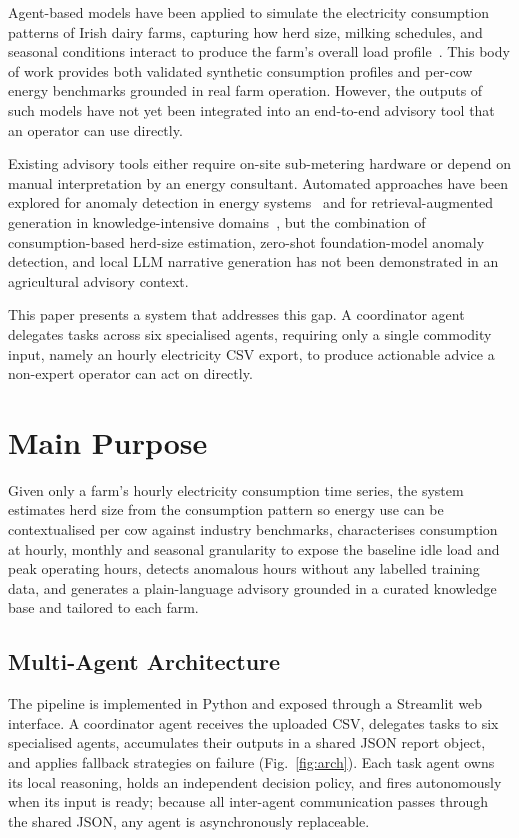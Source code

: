 \documentclass[runningheads]{llncs}
\begin{document}
Agent-based models have been applied to simulate the electricity consumption
patterns of Irish dairy farms, capturing how herd size, milking schedules, and
seasonal conditions interact to produce the farm's overall load
profile~\cite{Khaleghy2026}. This body of work provides both validated
synthetic consumption profiles and per-cow energy benchmarks grounded in real
farm operation. However, the outputs of such models have not yet been
integrated into an end-to-end advisory tool that an operator can use directly.

Existing advisory tools either require on-site sub-metering hardware or depend
on manual interpretation by an energy consultant. Automated approaches have
been explored for anomaly detection in energy systems~\cite{Cook2019} and for
retrieval-augmented generation in knowledge-intensive domains~\cite{Lewis2020},
but the combination of consumption-based herd-size estimation, zero-shot
foundation-model anomaly detection, and local LLM narrative generation has not
been demonstrated in an agricultural advisory context.

This paper presents a system that addresses this gap. A coordinator agent
delegates tasks across six specialised agents, requiring only a single
commodity input, namely an hourly electricity CSV export, to produce actionable
advice a non-expert operator can act on directly.

\section{Main Purpose}
\label{sec:purpose}

Given only a farm's hourly electricity consumption time series, the system
estimates herd size from the consumption pattern so energy use can be
contextualised per cow against industry benchmarks, characterises consumption
at hourly, monthly and seasonal granularity to expose the baseline idle load
and peak operating hours, detects anomalous hours without any labelled
training data, and generates a plain-language advisory grounded in a curated
knowledge base and tailored to each farm.

\subsection{Multi-Agent Architecture}

The pipeline is implemented in Python and exposed through a Streamlit web
interface. A coordinator agent receives the uploaded CSV, delegates tasks to
six specialised agents, accumulates their outputs in a shared JSON report
object, and applies fallback strategies on failure (Fig.~\ref{fig:arch}). Each
task agent owns its local reasoning, holds an independent decision policy,
and fires autonomously when its input is ready; because all inter-agent
communication passes through the shared JSON, any agent is asynchronously
replaceable.
\end{document}
